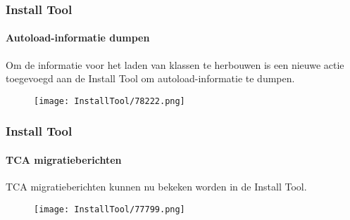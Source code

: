 
\begin{frame}[fragile]
	\frametitle{Install Tool}
	\framesubtitle{Autoload-informatie dumpen}

	Om de informatie voor het laden van klassen te herbouwen is een nieuwe actie
	toegevoegd aan de Install Tool om autoload-informatie te dumpen.

	\begin{figure}
		\texttt{[image: InstallTool/78222.png]}
	\end{figure}

\end{frame}


\begin{frame}[fragile]
	\frametitle{Install Tool}
	\framesubtitle{TCA migratieberichten}

	TCA migratieberichten kunnen nu bekeken worden in de Install Tool.

	\begin{figure}
		\texttt{[image: InstallTool/77799.png]}
	\end{figure}

\end{frame}


